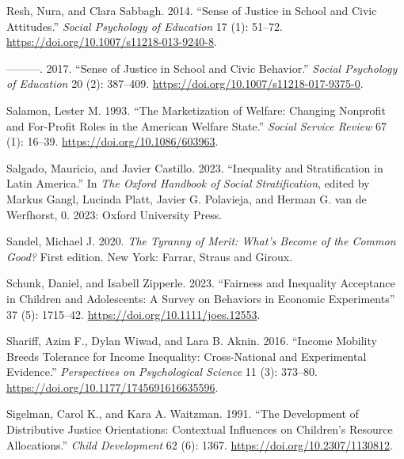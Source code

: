 \documentclass[
  letterpaper,
  DIV=11,
  numbers=noendperiod]{scrartcl}
\newlength{\cslhangindent}
\newlength{\cslentryspacingunit} %
\newenvironment{CSLReferences}[2] %
 {%
  \setlength{\parindent}{0pt}
  \ifodd #1
  \let\oldpar\par
  \def\par{\hangindent=\cslhangindent\oldpar}
  \fi
  \setlength{\parskip}{#2\cslentryspacingunit}
 }%
 {}
\begin{document}
\begin{CSLReferences}{1}{0}
\leavevmode{}%
Resh, Nura, and Clara Sabbagh. 2014. {``Sense of Justice in School and
Civic Attitudes.''} \emph{Social Psychology of Education} 17 (1):
51--72. \url{https://doi.org/10.1007/s11218-013-9240-8}.

\leavevmode{}%
---------. 2017. {``Sense of Justice in School and Civic Behavior.''}
\emph{Social Psychology of Education} 20 (2): 387--409.
\url{https://doi.org/10.1007/s11218-017-9375-0}.

\leavevmode{}%
Salamon, Lester M. 1993. {``The {Marketization} of {Welfare}: {Changing
Nonprofit} and {For-Profit Roles} in the {American Welfare State}.''}
\emph{Social Service Review} 67 (1): 16--39.
\url{https://doi.org/10.1086/603963}.

\leavevmode{}%
Salgado, Mauricio, and Javier Castillo. 2023. {``Inequality and
{Stratification} in {Latin America}.''} In \emph{The {Oxford Handbook}
of {Social Stratification}}, edited by Markus Gangl, Lucinda Platt,
Javier G. Polavieja, and Herman G. van de Werfhorst, 0. 2023: Oxford
University Press.

\leavevmode{}%
Sandel, Michael J. 2020. \emph{The Tyranny of Merit: {What}'s Become of
the Common Good?} First edition. New York: {Farrar, Straus and Giroux}.

\leavevmode{}%
Schunk, Daniel, and Isabell Zipperle. 2023. {``Fairness and Inequality
Acceptance in Children and Adolescents: {A} Survey on Behaviors in
Economic Experiments''} 37 (5): 1715--42.
\url{https://doi.org/10.1111/joes.12553}.

\leavevmode{}%
Shariff, Azim F., Dylan Wiwad, and Lara B. Aknin. 2016. {``Income
{Mobility Breeds Tolerance} for {Income Inequality}: {Cross-National}
and {Experimental Evidence}.''} \emph{Perspectives on Psychological
Science} 11 (3): 373--80.
\url{https://doi.org/10.1177/1745691616635596}.

\leavevmode{}%
Sigelman, Carol K., and Kara A. Waitzman. 1991. {``The {Development} of
{Distributive Justice Orientations}: {Contextual Influences} on
{Children}'s {Resource Allocations}.''} \emph{Child Development} 62 (6):
1367. \url{https://doi.org/10.2307/1130812}.


\end{CSLReferences}
\end{document}
